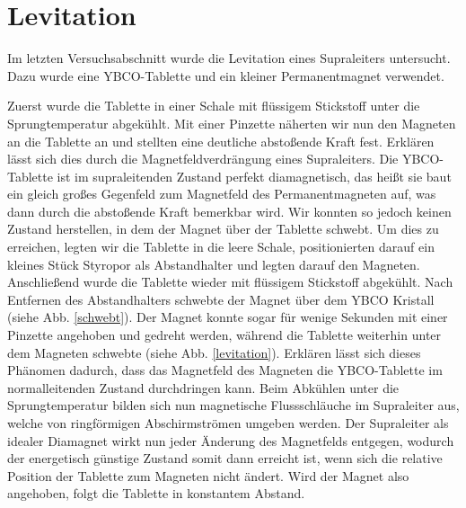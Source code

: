  
\section{Levitation}
Im letzten Versuchsabschnitt wurde die Levitation eines Supraleiters untersucht. Dazu wurde eine YBCO-Tablette und ein kleiner Permanentmagnet verwendet.

Zuerst wurde die Tablette in einer Schale mit flüssigem Stickstoff unter die Sprungtemperatur abgekühlt. Mit einer Pinzette näherten wir nun den Magneten an die Tablette an und stellten eine deutliche abstoßende Kraft fest. Erklären lässt sich dies durch die Magnetfeldverdrängung eines Supraleiters. Die YBCO-Tablette ist im supraleitenden Zustand perfekt diamagnetisch, das heißt sie baut ein gleich großes Gegenfeld zum Magnetfeld des Permanentmagneten auf, was dann durch die abstoßende Kraft bemerkbar wird. Wir konnten so jedoch keinen Zustand herstellen, in dem der Magnet über der Tablette schwebt. Um dies zu erreichen, legten wir die Tablette in die leere Schale, positionierten darauf ein kleines Stück Styropor als Abstandhalter und legten darauf den Magneten. Anschließend wurde die Tablette wieder mit flüssigem Stickstoff abgekühlt. Nach Entfernen des Abstandhalters schwebte der Magnet über dem YBCO Kristall (siehe Abb. \ref{schwebt}). Der Magnet konnte sogar für wenige Sekunden mit einer Pinzette angehoben und gedreht werden, während die Tablette weiterhin unter dem Magneten schwebte (siehe Abb. \ref{levitation}). Erklären lässt sich dieses Phänomen dadurch, dass das Magnetfeld des Magneten die YBCO-Tablette im normalleitenden Zustand durchdringen kann. Beim Abkühlen unter die Sprungtemperatur bilden sich nun magnetische Flussschläuche im Supraleiter aus, welche von ringförmigen Abschirmströmen umgeben werden. Der Supraleiter als idealer Diamagnet wirkt nun jeder Änderung des Magnetfelds entgegen, wodurch der energetisch günstige Zustand somit dann erreicht ist, wenn sich die relative Position der Tablette zum Magneten nicht ändert. Wird der Magnet also angehoben, folgt die Tablette in konstantem Abstand. \cite{hunklinger}


